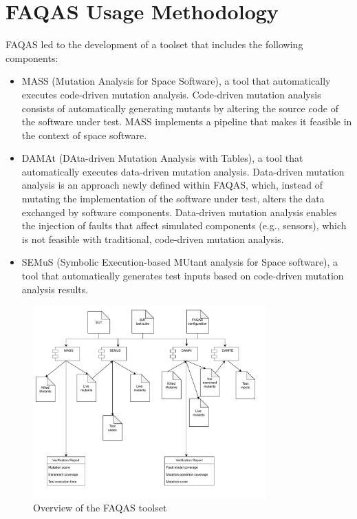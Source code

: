 
\chapter{FAQAS Usage Methodology}
\label{chapter:methodology}

FAQAS led to the development of a toolset that includes the following components:
\begin{itemize}
\item MASS (Mutation Analysis for Space Software), a tool that automatically executes code-driven mutation analysis. Code-driven mutation analysis consists of automatically generating mutants by altering the source code of the software under test. MASS implements a pipeline that makes it feasible in the context of space software. 
\item DAMAt (DAta-driven Mutation Analysis with Tables), a tool that automatically executes data-driven mutation analysis. Data-driven mutation analysis is an approach newly defined within FAQAS, which, instead of mutating the implementation of the software under test, alters the data exchanged by software components. Data-driven mutation analysis enables the injection of faults that affect simulated components (e.g., sensors), which is not feasible with traditional, code-driven mutation analysis.
\item SEMuS (Symbolic Execution-based MUtant analysis for Space software), a tool that automatically generates test inputs based on code-driven mutation analysis results. 
\end{itemize}

\begin{figure}[tb]
\begin{center}
\includegraphics[width=0.8\textwidth]{images/FAQAS.drawio.pdf}
\caption{Overview of the FAQAS toolset}
\label{fig:FAQAS:toolset}
\end{center}
\end{figure}

